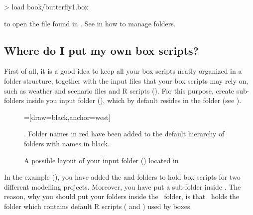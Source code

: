 \begin{usdialog}
> load book/butterfly1.box
\end{usdialog}

\noindent to open the file found in . See in  how to manage folders.


\subsection{Where do I put my own box scripts?}
First of all, it is a good idea to keep all your box scripts neatly organized in a folder structure, together with the input files that your box scripts may rely on, such as weather and scenario files and R scripts (). For this purpose, create sub-folders inside you input folder (), which by default resides in the  folder (see ).

\begin {figure} [ht]
\centering
{}=[draw=black,anchor=west]
\caption{A possible layout of your input folder () located in }. Folder names in red have been added to the default hierarchy of folders with names in black.
\label{fig:layout-input-folder}
\end{figure}

In the example  (), you have added the  and  folders to hold box scripts for two different modelling projects. Moreover, you have put a  sub-folder inside . The reason, why you should put your folders inside the \ folder, is that \ holds the  folder which contains default R scripts ( and ) used by  boxes.

